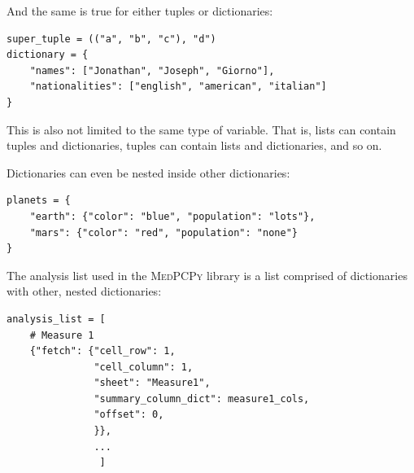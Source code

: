 \documentclass[a4paper,12pt]{article}
\begin{document}
And the same is true for either tuples or dictionaries:

\begin{tcolorbox}[
    enhanced,
    attach boxed title to top left={xshift=6mm,yshift=-3mm},
    colback=lightgreen!20,
    colframe=lightgreen,
    colbacktitle=lightgreen,
    title=Python,
    fonttitle=\bfseries\color{black},
    boxed title style={size=small,colframe=lightgreen,sharp corners},
    sharp corners,
    ]
    \begin{verbatim}
super_tuple = (("a", "b", "c"), "d")
dictionary = {
    "names": ["Jonathan", "Joseph", "Giorno"],
    "nationalities": ["english", "american", "italian"]
}
    \end{verbatim}
\end{tcolorbox}

This is also not limited to the same type of variable. That is, lists can contain tuples and dictionaries, tuples can contain lists and dictionaries, and so on.

Dictionaries can even be nested inside other dictionaries:

\begin{tcolorbox}[
    enhanced,
    attach boxed title to top left={xshift=6mm,yshift=-3mm},
    colback=lightgreen!20,
    colframe=lightgreen,
    colbacktitle=lightgreen,
    title=Python,
    fonttitle=\bfseries\color{black},
    boxed title style={size=small,colframe=lightgreen,sharp corners},
    sharp corners,
    ]
    \begin{verbatim}
planets = {
    "earth": {"color": "blue", "population": "lots"},
    "mars": {"color": "red", "population": "none"}
}
    \end{verbatim}
\end{tcolorbox}

The analysis list used in the {\scshape MedPCPy} library is a list comprised of dictionaries with other, nested dictionaries:

\begin{tcolorbox}[
    enhanced,
    attach boxed title to top left={xshift=6mm,yshift=-3mm},
    colback=lightgreen!20,
    colframe=lightgreen,
    colbacktitle=lightgreen,
    title=Python,
    fonttitle=\bfseries\color{black},
    boxed title style={size=small,colframe=lightgreen,sharp corners},
    sharp corners,
    ]
    \begin{verbatim}
analysis_list = [
    # Measure 1
    {"fetch": {"cell_row": 1,
               "cell_column": 1,
               "sheet": "Measure1",
               "summary_column_dict": measure1_cols,
               "offset": 0,
               }},
               ...
                ]
    \end{verbatim}
\end{tcolorbox}
\end{document}
